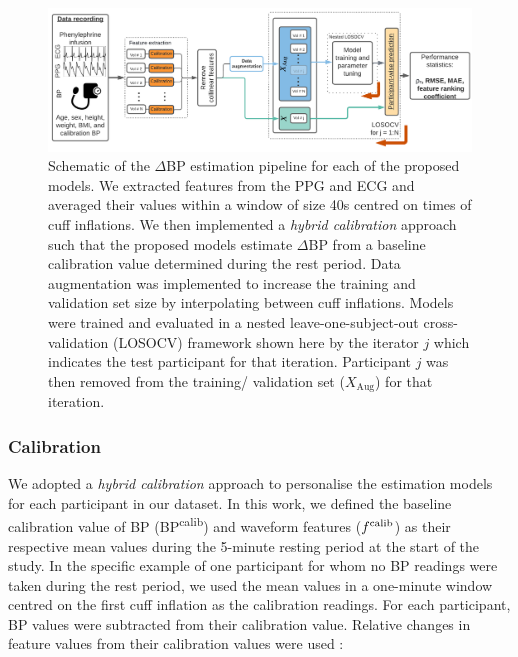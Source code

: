 \documentclass[fleqn,10pt]{wlscirep}
\begin{document}
\begin{figure}
	\centering
	\includegraphics[width = \textwidth]{MOLLIE2flow.png}
	\caption{Schematic of the $\Delta$BP estimation pipeline for each of the proposed models. We extracted features from the PPG and ECG and averaged their values within a window of size 40s centred on times of cuff inflations. We then implemented a \textit{hybrid calibration} approach such that the proposed models estimate $\Delta$BP from a baseline calibration value determined during the rest period. Data augmentation was implemented to increase the training and validation set size by interpolating between cuff inflations. Models were trained and evaluated in a nested leave-one-subject-out cross-validation (LOSOCV) framework shown here by the iterator $j$ which indicates the test participant for that iteration. Participant $j$ was then removed from the training/ validation set ($X_{\text{Aug}}$) for that iteration.}
	\label{fig:MOLLIE2_overview}
\end{figure}




\subsubsection{Calibration}

We adopted a \textit{hybrid calibration} \cite{Mukkamala2022a} approach to personalise the estimation models for each participant in our dataset. In this work, we defined the baseline calibration value of BP (BP\textsuperscript{calib}) and waveform features ($f\textsuperscript{calib}$) as their respective mean values during the 5-minute resting period at the start of the study. In the specific example of one participant for whom no BP readings were taken during the rest period, we used the mean values in a one-minute window centred on the first cuff inflation as the calibration readings. For each participant, BP values were subtracted from their calibration value. Relative changes in feature values from their calibration values were used \cite{Natarajan2021}:
\end{document}
